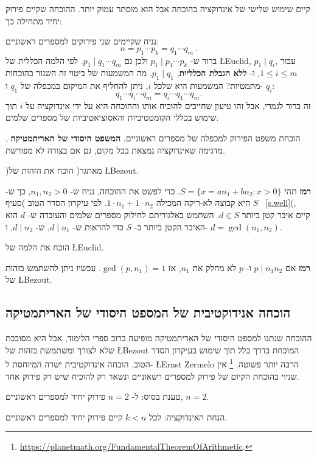 קיים שימוש שלישי של אינדוקציה בהוכחה אבל הוא מוסתר עמוק יותר. ההוכחה שקיים פירוק יחיד מתחילה כך:

נניח שקיימים שני פירוקים למספרים ראשוניים:
\[
n=p_1 \cdots p_k = q_1 \cdots q_m\,.
\]
ברור ש-%
$p_1\mid p_1 \cdots p_k$
ולכן גם
$p_1 \mid q_1 \cdots q_m$.
לפי הלמה הכללית של
\L{Euclid},
$p_1 \mid q_i$,
עבור
$1\leq i \leq m$,
ו-%
\textbf{ללא הגבלת הכלליות},
$p_1 \mid q_1$.
מה המשמעות של ביטוי זה השגור בהוכחות מתמטיות? המשמעות היא שלכל
$i$,
ניתן להחליף את המיקום במכפלה של
$q_1$
ו-%
$q_i$:
\[
q_1 \cdots q_i \cdots q_m = q_i \cdots q_1 \cdots q_m.
\]
זה ברור לגמרי, אבל זהו טיעון שחייבים להוכיח אותו וההוכחה היא על ידי אינדוקציה על
$i$
תוך שימוש בכללי הקומטטיביות והאסוציאטיביות של מספרים שלמים.

הוכחת משפט הפירוק למכפלה של מספרים ראשוניים,
\textbf{%
המשפט היסודי של האריתמטיקה%
},
מדגימה שאינדוקציה נמצאת בכל מקום, גם אם בצורה לא מפורשת.

\begin{exercise}
)מאתגר( הוכח את הזהות של
\L{Bezout}.
\end{exercise}
\textbf{רמז}
תהי
$S=\{x = an_1+bn_2: x>0\}$.
כדי לפשט את ההוכחה, נניח ש-%
$n_1,n_2>0$,
כך ש-%
$S$
היא קבוצה לא-ריקה המכילה
$1\cdot n_1+1\cdot n_2$.
לפי עיקרון הסדר הטוב )סעיף~%
\ref{s.well}(,
קיים איבר קטן ביותר
$d\in S$.
השתמש באלגוריתם לחילוק מספרים שלמים והעובדה ש-%
$d$
הוא האיבר הקטן ביותר ב-%
$S$
כדי להראות ש-%
$d\mid n_1$,
ש-%
$d\mid n_2$,
ו-%
$d=\gcd(n_1,n_2)$.

\begin{exercise}
הוכח את הלמה של
\L{Euclid}.
\end{exercise}
\textbf{רמז}
אם
$p\mid n_1n_2$
ו-%
$p$
לא מחלק את
$n_1$,
אז
$\gcd(p,n_1)=1$.
עכשיו ניתן להשתמש בזהות של
\L{Bezout}.

\subsection*{%
הוכחה אנידוקטיבית של המספט היסודי של האריתמטיקה%
}
ההוכחה שנתנו למספט היסודי של האריתמטיקה מופיעה ברוב ספרי הלימוד, אבל היא מסובכת שלא לצורך ומשתמשת בזהות של
\L{Bezout}
המוכחת בדרך כלל תוך שימוש בעיקרון הסדר הטוב. הוכחה אינדוקטיבית ישרה המיוחסת ל-%
\L{Ernst Zermelo}
הרבה יותר פשוטה.%
\footnote{\url{https://planetmath.org/FundamentalTheoremOfArithmetic}.}
אין שניוי בהוכחת הקיום של פירוק למספרים רשאוניים ונשאר רק להוכיח שיש רק פירוק אחד.

טענת בסיס: ל-%
$n=2$
פירוק יחיד למספרים ראשוניים, 
$n=2$. 

הנחת האינדוקציה: לכל
$k<n$
קיים פירוק יחיד למספרים ראשוניים.

